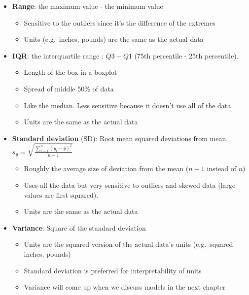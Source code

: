 \documentclass[]{book}
\providecommand{\tightlist}{%
  \setlength{\itemsep}{0pt}\setlength{\parskip}{0pt}}
\begin{document}
\begin{itemize}
\tightlist
\item
  \textbf{Range}: the maximum value - the minimum value

  \begin{itemize}
  \tightlist
  \item
    Sensitive to the outliers since it's the difference of the extremes
  \item
    Units (e.g.~inches, pounds) are the same as the actual data
  \end{itemize}
\item
  \textbf{IQR}: the interquartile range : \(Q3 - Q1\) (75th percentile - 25th percentile).

  \begin{itemize}
  \tightlist
  \item
    Length of the box in a boxplot
  \item
    Spread of middle 50\% of data
  \item
    Like the median. Less sensitive because it doesn't use all of the data
  \item
    Units are the same as the actual data
  \end{itemize}
\item
  \textbf{Standard deviation} (SD): Root mean squared deviations from mean, \(s_y = \sqrt{\frac{\sum^n_{i=1}(y_i-\bar{y})^2}{n-1}}\)

  \begin{itemize}
  \tightlist
  \item
    Roughly the average size of deviation from the mean (\(n-1\) instead of \(n\))
  \item
    Uses all the data but very sensitive to outliers and skewed data (large values are first squared).
  \item
    Units are the same as the actual data
  \end{itemize}
\item
  \textbf{Variance}: Square of the standard deviation

  \begin{itemize}
  \tightlist
  \item
    Units are the squared version of the actual data's units (e.g.~squared inches, pounds)
  \item
    Standard deviation is preferred for interpretability of units
  \item
    Variance will come up when we discuss models in the next chapter
  \end{itemize}
\end{itemize}
\end{document}
